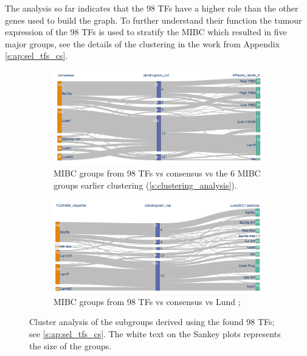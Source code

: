 The analysis so far indicates that the 98 TFs have a higher role than the other genes used to build the graph. To further understand their function the tumour expression of the 98 TFs is used to stratify the MIBC which resulted in five major groups, see the details of the clustering in the work from Appendix \cref{s:ap:sel_tfs_cs}.

\begin{figure}[!htb]
    \centering
    \begin{subfigure}[!t]{1.0\textwidth}
        \includegraphics[width=1.0\textwidth,keepaspectratio]{Sections/Network_I/Resources/selective_pruning/sel_tfs/sankey_sel_tfs_VU_CS.png}
        \caption{MIBC groups from 98 TFs vs consensus \citep{Kamoun2020-tj} vs the 6 MIBC groups earlier clustering (\ref{s:clustering_analysis}).}
        \label{fig:N_I:sankey_sel_tfs_vuCs}
    \end{subfigure}
    \begin{subfigure}[!t]{1.0\textwidth}
        \includegraphics[width=1.0\textwidth,keepaspectratio]{Sections/Network_I/Resources/selective_pruning/sel_tfs/sankey_sel_tfs.png}
        \caption{MIBC groups from 98 TFs vs consensus \citep{Kamoun2020-tj} vs Lund \citep{Marzouka2018-ge};}
        \label{fig:N_I:sankey_sel_tfs}
    \end{subfigure}
    \caption{Cluster analysis of the subgroups derived using the found 98 TFs; see \cref{s:ap:sel_tfs_cs}. The white text on the Sankey plots represents the size of the groups. }
    \label{fig:N_I:sel_tfs_cs_analysis}
\end{figure}


